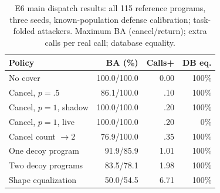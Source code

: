\begin{table}[t]\centering\footnotesize\setlength{\tabcolsep}{3pt}
\caption{E6 main dispatch results: all 115 reference programs, three seeds, known-population defense calibration; task-folded attackers. Maximum BA (cancel/return); extra calls per real call; database equality.}\label{tab:r7-e6}
\begin{tabularx}{\columnwidth}{@{}Yrrr@{}}\toprule
Policy & BA (\%) & Calls+ & DB eq.\\\midrule
No cover & 100.0/100.0 & 0.00 & 100\%\\
Cancel, $p=.5$ & 86.1/100.0 & .10 & 100\%\\
Cancel, $p=1$, shadow & 100.0/100.0 & .20 & 100\%\\
Cancel, $p=1$, live & 100.0/100.0 & .20 & 0\%\\
Cancel count $\to2$ & 76.9/100.0 & .35 & 100\%\\
One decoy program & 91.9/85.9 & 1.01 & 100\%\\
Two decoy programs & 83.5/78.1 & 1.98 & 100\%\\
Shape equalization & 50.0/54.5 & 6.71 & 100\%\\\bottomrule
\end{tabularx}\end{table}
